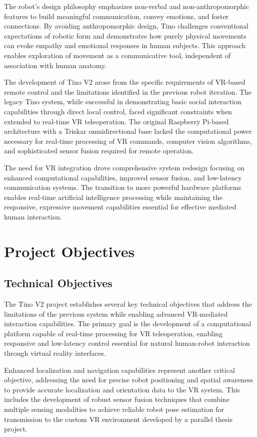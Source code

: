 The robot's design philosophy emphasizes non-verbal and non-anthropomorphic features to build meaningful communication, convey emotions, and foster connections. By avoiding anthropomorphic design, Tino challenges conventional expectations of robotic form and demonstrates how purely physical movements can evoke empathy and emotional responses in human subjects. This approach enables exploration of movement as a communicative tool, independent of association with human anatomy.

The development of Tino V2 arose from the specific requirements of VR-based remote control and the limitations identified in the previous robot iteration. The legacy Tino system, while successful in demonstrating basic social interaction capabilities through direct local control, faced significant constraints when extended to real-time VR teleoperation. The original Raspberry Pi-based architecture with a Triskar omnidirectional base lacked the computational power necessary for real-time processing of VR commands, computer vision algorithms, and sophisticated sensor fusion required for remote operation.

The need for VR integration drove comprehensive system redesign focusing on enhanced computational capabilities, improved sensor fusion, and low-latency communication systems. The transition to more powerful hardware platforms enables real-time artificial intelligence processing while maintaining the responsive, expressive movement capabilities essential for effective mediated human interaction.

\section{Project Objectives}

\subsection{Technical Objectives}
The Tino V2 project establishes several key technical objectives that address the limitations of the previous system while enabling advanced VR-mediated interaction capabilities. The primary goal is the development of a computational platform capable of real-time processing for VR teleoperation, enabling responsive and low-latency control essential for natural human-robot interaction through virtual reality interfaces.

Enhanced localization and navigation capabilities represent another critical objective, addressing the need for precise robot positioning and spatial awareness to provide accurate localization and orientation data to the VR system. This includes the development of robust sensor fusion techniques that combine multiple sensing modalities to achieve reliable robot pose estimation for transmission to the custom VR environment developed by a parallel thesis project.


